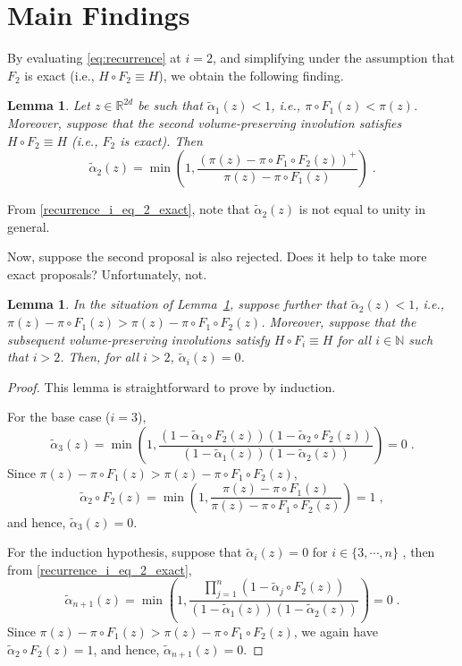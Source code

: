 \documentclass[11pt]{article}
\theoremstyle{plain}%
\newtheorem{lemma}[prototheorem]{Lemma}
\begin{document}
  


\section*{Main Findings}

By evaluating \eqref{eq:recurrence} at $i=2$, and simplifying under the assumption that $F_2$ is exact (i.e., $H \circ F_2 \equiv H$), we obtain the following finding.

\begin{lemma} \label{lem:exactsecond}
Let $z \in \mathbb{R}^{2d}$ be such that  $\tilde{\alpha}_1(z) < 1$, i.e., $\pi \circ F_1(z) < \pi(z)$.  Moreover, suppose that the second volume-preserving involution satisfies $H \circ F_2 \equiv H$ (i.e., $F_2$ is exact).  Then \begin{equation} \label{recurrence_i_eq_2_exact}
\tilde{\alpha}_2(z) = \min\left(1, \dfrac{  (\pi(z)  -  \pi \circ F_1 \circ F_2(z) )^+ }{  \pi(z) - \pi \circ F_1(z) } \right) \;.
\end{equation}
\end{lemma}

From \eqref{recurrence_i_eq_2_exact}, note that $\tilde{\alpha}_2(z)$ is not equal to unity in general.  


\medskip


Now, suppose the second proposal is also rejected. Does it help to take more exact proposals?  Unfortunately, not.  


\begin{lemma} \label{lem:exactinfinite}
    In the situation of Lemma~\ref{lem:exactsecond}, suppose further that $\tilde{\alpha}_2(z) < 1$, i.e., $ \pi(z) - \pi \circ F_1(z) > \pi(z) - \pi \circ F_1 \circ F_2 (z)$.  Moreover, suppose that the subsequent volume-preserving involutions satisfy $H \circ F_i \equiv H$ for all $i \in \mathbb{N}$ such that $i>2$. Then, for all $i>2$, $\tilde{\alpha}_i(z) = 0$.  
\end{lemma}

\begin{proof} This lemma is straightforward to prove by induction.  

\medskip

For the base case ($i=3$), \[
\tilde \alpha_{3} (z) = \min\left(1, \frac{ (1- \tilde \alpha_1 \circ F_2(z)) (1- \tilde \alpha_2 \circ F_2(z))}{(1- \tilde \alpha_1(z)) (1- \tilde \alpha_2(z))} \right) = 0 \;. 
\] Since $\pi(z) - \pi \circ F_1(z) > \pi(z) - \pi \circ F_1 \circ F_2(z) $,  \[
\tilde \alpha_2 \circ F_2(z) = \min\left( 1 , \dfrac{\pi(z) - \pi \circ F_1(z)}{\pi(z) - \pi \circ F_1 \circ F_2(z)} \right) = 1 \;,
\] and hence, $\tilde{\alpha}_3 (z) = 0$.   

\medskip

For the induction hypothesis, suppose that $\tilde{\alpha}_i(z)=0$ for $i \in \{3, \cdots, n \}$ , then from \eqref{recurrence_i_eq_2_exact}, \[
\tilde \alpha_{n+1} (z) = \min\left(1, \frac{\prod_{j=1}^{n} (1- \tilde \alpha_j \circ F_2(z) )}{(1- \tilde \alpha_1(z)) (1- \tilde \alpha_2(z))} \right) = 0 \;.
\] Since $\pi(z) - \pi \circ F_1(z) > \pi(z) - \pi \circ F_1 \circ F_2(z) $, we again have $\tilde \alpha_2 \circ F_2(z) = 1$, and hence, $\tilde{\alpha}_{n+1} (z) = 0$.  
\end{proof}
\end{document}
